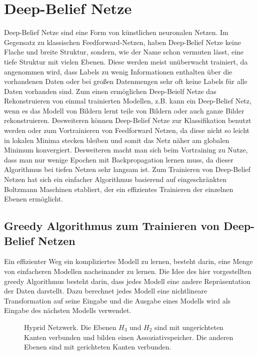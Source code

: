 \documentclass[12pt]{article}
\begin{document}
\section{Deep-Belief Netze}
Deep-Belief Netze sind eine Form von künstlichen neuronalen Netzen. Im Gegensatz zu klassischen Feedforward-Netzen, haben Deep-Belief Netze keine Flache und breite Struktur, sondern, wie der Name schon vermuten lässt, eine tiefe Struktur mit vielen Ebenen.   Diese werden meist unüberwacht trainiert, da angenommen wird, dass Labels zu wenig Informationen enthalten über die vorhandenen Daten oder bei großen Datenmengen sehr oft keine Labels für alle Daten vorhanden sind.  Zum einen ermöglichen Deep-Beielf Netze das Rekonstruieren von einmal trainierten Modellen, z.B. kann ein Deep-Belief Netz, wenn es das Modell von Bildern lernt teile von Bildern oder auch ganze Bilder rekonstruieren. Desweiteren können Deep-Belief Netze zur Klassifikation benutzt werden oder zum Vortrainieren von Feedforward Netzen, da diese nicht so leicht in lokalen Minima stecken bleiben und somit das Netz näher am globalen Minimum konvergiert. Desweiteren macht man sich beim Vortraining zu Nutze, dass man nur wenige Epochen mit Backpropagation lernen muss, da dieser Algorithmus bei tiefen Netzen sehr langsam ist. Zum Trainieren von Deep-Belief Netzen hat sich ein einfacher Algorithmus basierend auf eingeschränkten Boltzmann Maschinen etabliert, der ein effizientes Trainieren der einzelnen Ebenen ermöglicht. 



\subsection{Greedy Algorithmus zum Trainieren von Deep-Belief Netzen}


Ein effizienter Weg ein kompliziertes Modell zu lernen, besteht darin, eine Menge von einfacheren Modellen nacheinander zu lernen. Die Idee des hier vorgestellten greedy Algorithmus besteht darin, dass jedes Modell eine andere Repräsentation der Daten darstellt. Dazu berechnet jedes Modell eine nichtlineare Transformation auf seine Eingabe und die Ausgabe eines Modells wird als Eingabe des nächsten Modells verwendet. 

\begin{figure}[H]
	\center
	
	\caption{Hyprid Netzwerk. Die Ebenen $H_3$ und $H_2$ sind mit ungerichteten Kanten verbunden und bilden einen Assoziativspeicher. Die anderen Ebenen sind mit gerichteten Kanten verbunden.}
	\label{Netz}
\end{figure}
\end{document}
